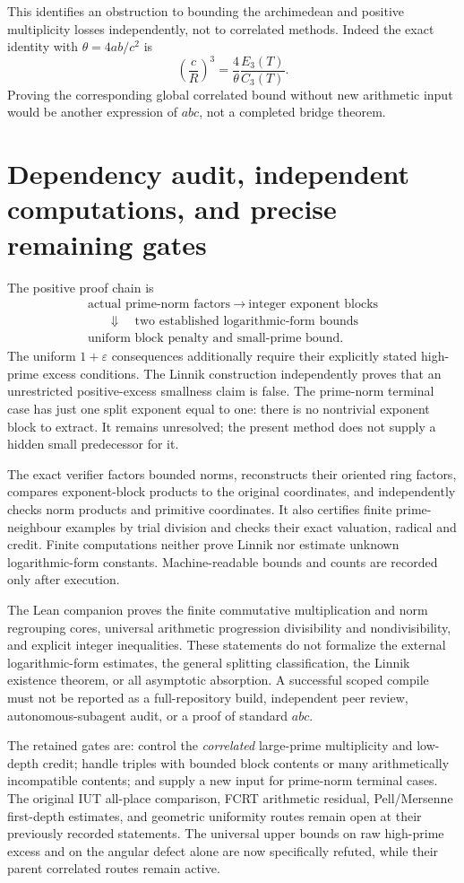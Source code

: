 This identifies an obstruction to bounding the archimedean and positive
multiplicity losses independently, not to correlated methods. Indeed the
exact identity with $\theta=4ab/c^2$ is
\[
 \left(\frac cR\right)^3
 =\frac4\theta\frac{E_3(T)}{C_3(T)}.
\]
Proving the corresponding global correlated bound without new arithmetic
input would be another expression of $abc$, not a completed bridge theorem.

\section{Dependency audit, independent computations, and precise remaining gates}
\label{sec:ep-audit}
The positive proof chain is
\[
\begin{gathered}
 \text{actual prime-norm factors}\ \longrightarrow\
 \text{integer exponent blocks}\\
 \mathrel{\phantom{\longrightarrow}}\Downarrow\quad
 \text{two established logarithmic-form bounds}\\
 \text{uniform block penalty and small-prime bound}.
\end{gathered}
\]
The uniform $1+\varepsilon$ consequences additionally require their explicitly
stated high-prime excess conditions. The Linnik construction independently
proves that an unrestricted positive-excess smallness claim is false.
The prime-norm terminal case has just one split exponent equal to one: there
is no nontrivial exponent block to extract. It remains unresolved; the present
method does not supply a hidden small predecessor for it.

The exact verifier factors bounded norms, reconstructs their oriented ring
factors, compares exponent-block products to the original coordinates, and
independently checks norm products and primitive coordinates. It also certifies
finite prime-neighbour examples by trial division and checks their exact
valuation, radical and credit. Finite computations neither prove Linnik nor
estimate unknown logarithmic-form constants. Machine-readable bounds and counts
are recorded only after execution.

The Lean companion proves the finite commutative multiplication and norm
regrouping cores, universal arithmetic progression divisibility and
nondivisibility, and explicit integer inequalities. These statements do not
formalize the external logarithmic-form estimates, the general splitting
classification, the Linnik existence theorem, or all asymptotic absorption.
A successful scoped compile must not be reported as a full-repository build,
independent peer review, autonomous-subagent audit, or a proof of standard $abc$.

The retained gates are: control the \emph{correlated} large-prime multiplicity
and low-depth credit; handle triples with bounded block contents or many
arithmetically incompatible contents; and supply a new input for prime-norm
terminal cases. The original IUT all-place comparison, FCRT arithmetic residual,
Pell/Mersenne first-depth estimates, and geometric uniformity routes remain
open at their previously recorded statements. The universal upper bounds on
raw high-prime excess and on the angular defect alone are now specifically
refuted, while their parent correlated routes remain active.
